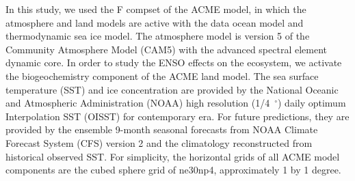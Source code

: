 In this study, we used the F compset of the ACME model, in which the atmosphere and land models are active 
with the data ocean model and thermodynamic sea ice model. The atmosphere model is version 5 of the Community 
Atmosphere Model (CAM5) with the advanced spectral element dynamic core. In order to study the 
ENSO effects on the ecosystem, we activate the biogeochemistry component of the ACME land model. The sea surface
temperature (SST) and ice concentration are provided by the National Oceanic and Atmospheric Administration (NOAA) 
high resolution (1/4~$^{\circ}$) daily optimum Interpolation SST (OISST) for contemporary era. For future predictions, 
they are provided by the ensemble 9-month seasonal forecasts from NOAA Climate Forecast System (CFS) version 2 and 
the climatology reconstructed from historical observed SST. For simplicity, the horizontal grids of all ACME model 
components are the cubed sphere grid of ne30np4, approximately 1 by 1 degree.    
   
